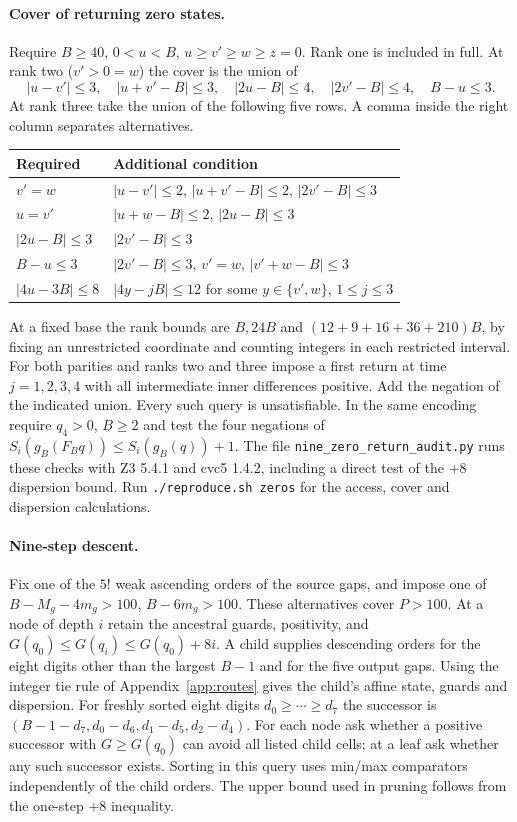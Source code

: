 \documentclass[11pt,reqno]{amsart}
\newcommand{\runcheck}[1]{\texttt{./reproduce.sh\ #1}}
\newcommand{\file}[1]{\nolinkurl{#1}}
\begin{document}
\paragraph{Cover of returning zero states.}
Require $B\ge40$, $0<u<B$, $u\ge v'\ge w\ge z=0$. Rank one is included
in full. At rank two ($v'>0=w$) the cover is the union of
\[
 |u-v'|\le3,\quad |u+v'-B|\le3,\quad |2u-B|\le4,\quad
 |2v'-B|\le4,\quad B-u\le3 .
\]
At rank three take the union of the following five rows. A comma inside
the right column separates alternatives.
\begin{center}\small
\begin{tabular}{@{}ll@{}}
\toprule
Required & Additional condition\\\midrule
$v'=w$ & $|u-v'|\le2$, $|u+v'-B|\le2$, $|2v'-B|\le3$\\
$u=v'$ & $|u+w-B|\le2$, $|2u-B|\le3$\\
$|2u-B|\le3$ & $|2v'-B|\le3$\\
$B-u\le3$ & $|2v'-B|\le3$, $v'=w$, $|v'+w-B|\le3$\\
$|4u-3B|\le8$ & $|4y-jB|\le12$ for some $y\in\{v',w\}$, $1\le j\le3$\\
\bottomrule
\end{tabular}
\end{center}
At a fixed base the rank bounds are $B,24B$ and
$(12+9+16+36+210)B$, by fixing an unrestricted coordinate and counting
integers in each restricted interval. For both parities and ranks two
and three impose a first return at time $j=1,2,3,4$ with all intermediate
inner differences positive. Add the negation of the indicated union.
Every such query is unsatisfiable. In the same encoding require $q_4>0$,
$B\ge2$ and test the four negations of $S_i(g_B(F_Bq))\le S_i(g_B(q))+1$.
The file \file{nine_zero_return_audit.py} runs these checks with
Z3 5.4.1 and cvc5 1.4.2, including a direct test of the $+8$ dispersion
bound. Run \runcheck{zeros} for the access, cover and dispersion
calculations.

\paragraph{Nine-step descent.}
Fix one of the $5!$ weak ascending orders of the source gaps, and impose
one of $B-M_g-4m_g>100$, $B-6m_g>100$. These alternatives cover $P>100$.
At a node of depth $i$ retain the ancestral guards, positivity,
and $G(q_0)\le G(q_i)\le G(q_0)+8i$. A child supplies descending orders
for the eight digits other than the largest $B-1$ and for the five output
gaps. Using the integer tie rule of Appendix~\ref{app:routes} gives the
child's affine state, guards and dispersion. For freshly sorted
eight digits $d_0\ge\cdots\ge d_7$ the successor is
$(B-1-d_7,d_0-d_6,d_1-d_5,d_2-d_4)$. For each node ask whether a
positive successor with $G\ge G(q_0)$ can avoid all listed child cells;
at a leaf ask whether any such successor exists. Sorting in this query
uses min/max comparators independently of the child orders.
The upper bound used in pruning follows from the one-step $+8$ inequality.
\end{document}
